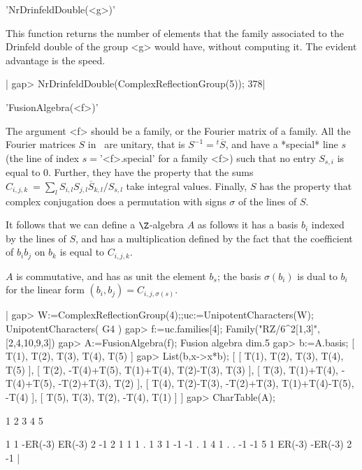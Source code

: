 
'NrDrinfeldDouble(<g>)'

This function returns the number of elements that the family associated to the
Drinfeld double of the group <g> would have, without computing it. The evident
advantage is the speed.

|    gap> NrDrinfeldDouble(ComplexReflectionGroup(5));
    378|


'FusionAlgebra(<f>)'

The argument <f> should be a family, or the Fourier matrix of a family. All
the Fourier matrices $S$ in \CHEVIE\ are unitary, that is
$S^{-1}={}^t{\overline  S}$, and  have a  *special* line  $s$ (the  line of
index  $s=$'<f>.special' for a family <f>)  such that no entry $S_{s,i}$ is
equal to $0$. Further, they have the property that the sums
$C_{i,j,k}\:=\sum_l   S_{i,l}   S_{j,l}{\overline   S}_{k,l}/S_{s,l}$  take
integral  values. Finally,  $S$ has  the property  that complex conjugation
does a permutation with signs $\sigma$ of the lines of $S$.

It follows that we can define a $\Z$-algebra $A$ as follows\: it has a basis
$b_i$  indexed by the lines of $S$, and has a multiplication defined by the
fact that the coefficient of $b_ib_j$ on $b_k$ is equal to $C_{i,j,k}$.

$A$  is  commutative,  and  has  as  unit  the  element  $b_s$;  the  basis
$\sigma(b_i)$ is dual to $b_i$ for the linear form
$(b_i,b_j)=C_{i,j,\sigma(s)}$.

|    gap> W:=ComplexReflectionGroup(4);;uc:=UnipotentCharacters(W);
    UnipotentCharacters( G4 )
    gap> f:=uc.families[4];
    Family("RZ/6^2[1,3]",[2,4,10,9,3])
    gap> A:=FusionAlgebra(f);
    Fusion algebra dim.5
    gap> b:=A.basis;
    [ T(1), T(2), T(3), T(4), T(5) ]
    gap> List(b,x->x*b);
    [ [ T(1), T(2), T(3), T(4), T(5) ],
      [ T(2), -T(4)+T(5), T(1)+T(4), T(2)-T(3), T(3) ],
      [ T(3), T(1)+T(4), -T(4)+T(5), -T(2)+T(3), T(2) ],
      [ T(4), T(2)-T(3), -T(2)+T(3), T(1)+T(4)-T(5), -T(4) ],
      [ T(5), T(3), T(2), -T(4), T(1) ] ]
    gap> CharTable(A);

        1        2        3   4   5

    1   1  -ER(-3)   ER(-3)   2  -1
    2   1        1        1   .   1
    3   1       -1       -1   .   1
    4   1        .        .  -1  -1
    5   1   ER(-3)  -ER(-3)   2  -1
|

